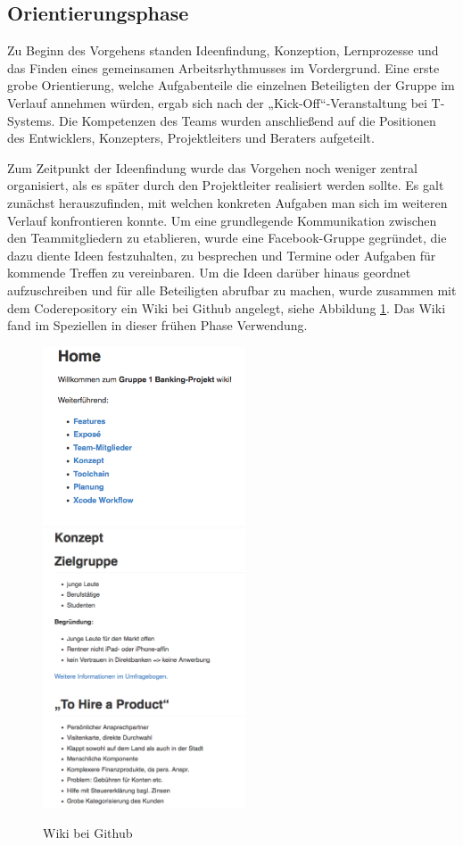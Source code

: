 \subsection{Orientierungsphase}
	Zu Beginn des Vorgehens standen Ideenfindung, Konzeption, Lernprozesse und das Finden eines gemeinsamen Arbeitsrhythmusses im Vordergrund. Eine erste grobe Orientierung, welche Aufgabenteile die einzelnen Beteiligten der Gruppe im Verlauf annehmen würden, ergab sich nach der „Kick-Off“-Veranstaltung bei T-Systems. Die Kompetenzen des Teams wurden anschließend auf die Positionen des Entwicklers, Konzepters, Projektleiters und Beraters aufgeteilt. 
	
	Zum Zeitpunkt der Ideenfindung wurde das Vorgehen noch weniger zentral organisiert, als es später durch den Projektleiter realisiert werden sollte. Es galt zunächst herauszufinden, mit welchen konkreten Aufgaben man sich im weiteren Verlauf konfrontieren konnte. Um eine grundlegende Kommunikation zwischen den Teammitgliedern zu etablieren, wurde eine Facebook-Gruppe gegründet, die dazu diente Ideen festzuhalten, zu besprechen und Termine oder Aufgaben für kommende Treffen zu vereinbaren. Um die Ideen darüber hinaus geordnet aufzuschreiben und für alle Beteiligten abrufbar zu machen, wurde zusammen mit dem Coderepository ein Wiki bei Github angelegt, siehe Abbildung \ref{fig:WikiHome}. Das Wiki fand im Speziellen in dieser frühen Phase Verwendung.
	
\begin{figure}[h]
	\centering
	\includegraphics[width=6cm]{Pictures/wiki_home}
	\includegraphics[width=6cm]{Pictures/wiki-konzept}
	\caption{Wiki bei Github\label{fig:WikiHome}}
\end{figure}

